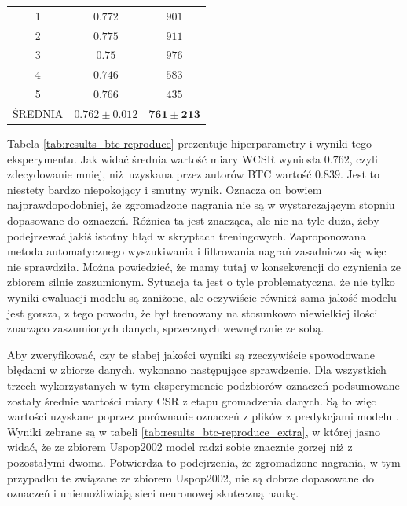 \begin{table}
{\begin{tabular}{ccc}
        1                 & $0.772$    & $901$    \\
        2                 & $0.775$    & $911$    \\
        3                 & $0.75$    & $976$    \\
        4                 & $0.746$    & $583$    \\
        5                 & $0.766$    & $435$    \\ \hline
        ŚREDNIA           & $\mathbf{0.762 \pm 0.012}$ & $\mathbf{761 \pm 213}$ \\ \hline
    \end{tabular}
    }
\end{table}

Tabela \ref{tab:results_btc-reproduce} prezentuje hiperparametry i wyniki tego eksperymentu. Jak widać średnia wartość miary WCSR wyniosła $0.762$, czyli zdecydowanie mniej, niż uzyskana przez autorów BTC wartość $0.839$. Jest to niestety bardzo niepokojący i smutny wynik. Oznacza on bowiem najprawdopodobniej, że zgromadzone nagrania nie są w wystarczającym stopniu dopasowane do oznaczeń. Różnica ta jest znacząca, ale nie na tyle duża, żeby podejrzewać jakiś istotny błąd w skryptach treningowych. Zaproponowana metoda automatycznego wyszukiwania i filtrowania nagrań zasadniczo się więc nie sprawdziła. Można powiedzieć, że mamy tutaj w konsekwencji do czynienia ze zbiorem silnie zaszumionym. Sytuacja ta jest o tyle problematyczna, że nie tylko wyniki ewaluacji modelu są zaniżone, ale oczywiście również sama jakość modelu jest gorsza, z tego powodu, że był trenowany na stosunkowo niewielkiej ilości znacząco zaszumionych danych, sprzecznych wewnętrznie ze sobą.

Aby zweryfikować, czy te słabej jakości wyniki są rzeczywiście spowodowane błędami w zbiorze danych, wykonano następujące sprawdzenie. Dla wszystkich trzech wykorzystanych w tym eksperymencie podzbiorów oznaczeń podsumowane zostały średnie wartości miary CSR z etapu gromadzenia danych. Są to więc wartości uzyskane poprzez porównanie oznaczeń z plików  z predykcjami modelu \cite{korzeniowski_feature_2016}. Wyniki zebrane są w tabeli \ref{tab:results_btc-reproduce_extra}, w której jasno widać, że ze zbiorem Uspop2002 model radzi sobie znacznie gorzej niż z pozostałymi dwoma. Potwierdza to podejrzenia, że zgromadzone nagrania, w tym przypadku te związane ze zbiorem Uspop2002, nie są dobrze dopasowane do oznaczeń i uniemożliwiają sieci neuronowej skuteczną naukę.

